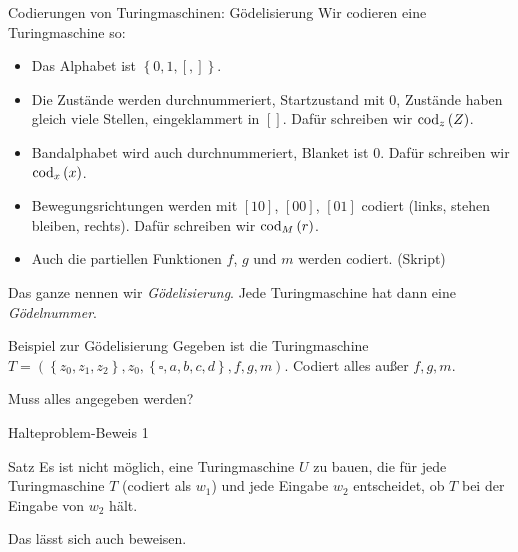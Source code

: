 \begin{frame}{Codierungen von Turingmaschinen: Gödelisierung}
    Wir codieren eine Turingmaschine so:
    \begin{itemize}
        \item Das Alphabet ist $\left\{ 0, 1, [, ] \right\}$.
            \pause
        \item Die Zustände werden durchnummeriert, Startzustand mit $0$, Zustände haben gleich viele Stellen, eingeklammert in $[]$. Dafür schreiben wir $\operatorname{cod}_z\left( Z \right)$.
            \pause
        \item Bandalphabet wird auch durchnummeriert, Blanket ist $0$. Dafür schreiben wir $\operatorname{cod}_x\left( x \right)$.
            \pause
        \item Bewegungsrichtungen werden mit $[10]$, $[00]$, $[01]$ codiert (links, stehen bleiben, rechts). Dafür schreiben wir $\operatorname{cod}_M\left( r \right)$.
        \item Auch die partiellen Funktionen $f$, $g$ und $m$ werden codiert. (Skript)
    \end{itemize}
    \pause
    Das ganze nennen wir \emph{Gödelisierung}. Jede Turingmaschine hat dann eine \emph{Gödelnummer}.
\end{frame}
\begin{frame}{Beispiel zur Gödelisierung}
Gegeben ist die Turingmaschine $T = \left( \left\{ z_0, z_1, z_2 \right\}, z_0, \left\{ \square, a, b, c, d \right\}, f, g, m \right)$. Codiert alles außer $f, g, m$.
    \begin{itemize}
    \end{itemize}
    Muss alles angegeben werden?\\
\end{frame}
\begin{frame}{Halteproblem-Beweis 1}
    \begin{block}{Satz}
        Es ist nicht möglich, eine Turingmaschine $U$ zu bauen, die für jede Turingmaschine $T$ (codiert als $w_1$) und jede Eingabe $w_2$  entscheidet, ob $T$ bei der Eingabe von $w_2$ hält.
    \end{block}
    Das lässt sich auch beweisen. 
\end{frame}
